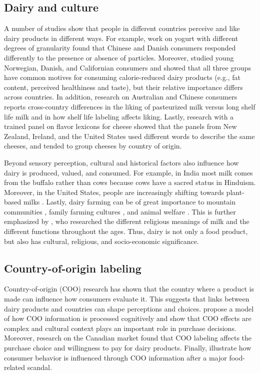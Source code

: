 \documentclass[sigconf]{acmart-txmm}
\begin{document}
\subsection{Dairy and culture}
A number of studies show that people in different countries perceive and like dairy products in different ways.
For example, work on yogurt with different degrees of granularity \cite{LiuJing2021Palo} found that Chinese and Danish consumers responded differently to the presence or absence of particles. 
Moreover, \citeauthor{JohansenSusanneBølling2011Mfca} \cite{JohansenSusanneBølling2011Mfca} studied young Norwegian, Danish, and Californian consumers and showed that all three groups have common motives for consuming calorie-reduced dairy products (e.g., fat content, perceived healthiness and taste), but their relative importance differs across countries.
In addition, research on Australian and Chinese consumers \cite{LiemD.G.2016ScIo} reports cross-country differences in the liking of pasteurized milk versus long shelf life milk and in how shelf life labeling affects liking.
Lastly, research with a trained panel on flavor lexicons for cheese \cite{DrakeM.A.2005Codb} showed that the panels from New Zealand, Ireland, and the United States used different words to describe the same cheeses, and tended to group cheeses by country of origin.

Beyond sensory perception, cultural and historical factors also influence how dairy is produced, valued, and consumed.
For example, in India most milk comes from the buffalo rather than cows because cows have a sacred status in Hinduism.
Moreover, in the United States, people are increasingly shifting towards plant-based milks \cite{alma9940205190205131}.
Lastly, dairy farming can be of great importance to mountain communities \cite{alma9942695182705131}, family farming cultures \cite{HuRen2021TFFC}, and animal welfare \cite{SinclairMichelle2022Ipoa}.
This is further emphasized by \citeauthor{ValenzeDeborahM.2011MALa} \cite{ValenzeDeborahM.2011MALa}, who researched the different religious meanings of milk and the different functions throughout the ages.
Thus, dairy is not only a food product, but also has cultural, religious, and socio-economic significance.

\subsection{Country-of-origin labeling}
Country-of-origin (COO) research has shown that the country where a product is made can influence how consumers evaluate it.
This suggests that links between dairy products and countries can shape perceptions and choices.
\citeauthor{KnightGaryA.2000Afmo} \cite{KnightGaryA.2000Afmo} propose a model of how COO information is processed cognitively and show that COO effects are complex and cultural context plays an important role in purchase decisions.
Moreover, research on the Canadian market \cite{NorrisAmanda2019CPfC} found that COO labeling affects the purchase choice and willingness to pay for dairy products.
Finally, \citeauthor{YangRongbin2018Aiit} \cite{YangRongbin2018Aiit} illustrate how consumer behavior is influenced through COO information after a major food-related scandal.
\end{document}
